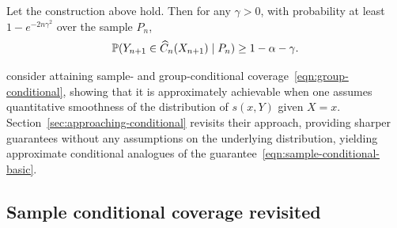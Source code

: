 \documentclass{article}
\newcommand{\scorefunc}{s}
\newcommand{\scoreval}{\scorefunc}
\begin{document}
\begin{proposition}
  \label{proposition:sample-conditional-basic}
  Let the construction above hold. Then for any $\gamma > 0$, with
  probability at least $1 - e^{-2n\gamma^2}$ over the sample $P_n$,
  \begin{equation}
    \mathbb{P}(Y_{n + 1} \in \widehat{C}_n(X_{n + 1}) \mid P_n) \ge 1 - \alpha - \gamma.
    \label{eqn:sample-conditional-basic}
  \end{equation}
\end{proposition}

\citet{JungNoRaRo23} consider attaining sample-
and group-conditional coverage~\eqref{eqn:group-conditional}, showing that
it is approximately achievable when one
assumes quantitative smoothness of the distribution of
$\scoreval(x, Y)$ given $X = x$.
%
Section~\ref{sec:approaching-conditional} revisits their approach, providing
sharper guarantees without any assumptions on the underlying distribution,
yielding approximate conditional analogues of the
guarantee~\eqref{eqn:sample-conditional-basic}.

%

\subsection{Sample conditional coverage revisited}
\label{sec:main-basic-sample-coverage}
\end{document}

